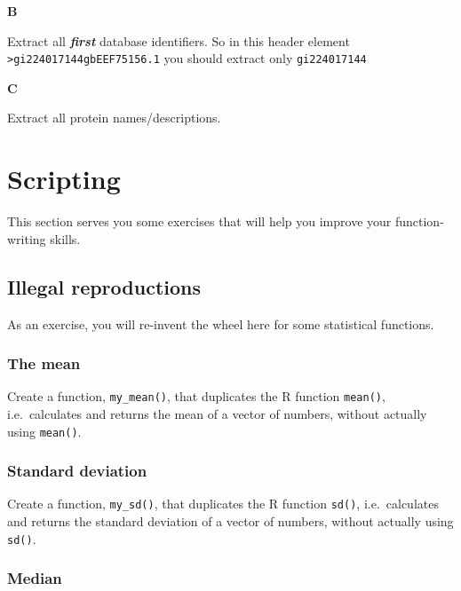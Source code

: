 \documentclass[]{book}
\begin{document}
\textbf{B}

Extract all \textbf{\emph{first}} database identifiers. So in this header element \texttt{\textgreater{}gi\textbar{}224017144\textbar{}gb\textbar{}EEF75156.1\textbar{}} you should extract only \texttt{gi\textbar{}224017144}

\textbf{C}

Extract all protein names/descriptions.

\hypertarget{scripting-2}{%
\section{Scripting}\label{scripting-2}}

This section serves you some exercises that will help you improve your function-writing skills.

\hypertarget{illegal-reproductions}{%
\subsection{Illegal reproductions}\label{illegal-reproductions}}

As an exercise, you will re-invent the wheel here for some statistical functions.

\hypertarget{the-mean}{%
\subsubsection*{The mean}\label{the-mean}}

Create a function, \texttt{my\_mean()}, that duplicates the R function \texttt{mean()}, i.e.~calculates and returns the mean of a vector of numbers, without actually using \texttt{mean()}.

\hypertarget{standard-deviation}{%
\subsubsection*{Standard deviation}\label{standard-deviation}}

Create a function, \texttt{my\_sd()}, that duplicates the R function \texttt{sd()}, i.e.~calculates and returns the standard deviation of a vector of numbers, without actually using \texttt{sd()}.

\hypertarget{median}{%
\subsubsection*{Median}\label{median}}
\end{document}
